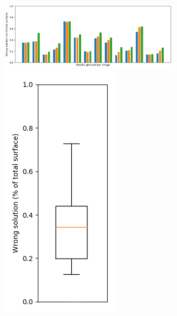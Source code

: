 \documentclass[a4paper,titlepage,12pt]{article}
\begin{document}
\begin{figure}
	\centering
	\begin{subfigure}{\linewidth}
		\centering
		\includegraphics[width=0.8\columnwidth]{results/chart_surf4}
		\includegraphics[width=0.15\columnwidth]{results/chart_wrongbox}
		\caption{}
	\end{subfigure}
	

\end{figure}
\end{document}
